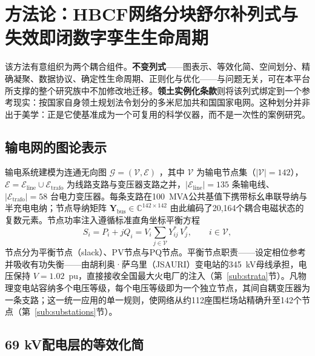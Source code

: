 \section{方法论：HBCF网络分块舒尔补列式与失效即闭数字孪生生命周期}
\label{sec:methodology}

该方法有意组织为两个耦合组件。\textbf{不变列式}——图表示、等效化简、空间划分、精确凝聚、数据协议、确定性生命周期、正则化与优化——与问题无关，可在本平台所支撑的整个研究族中不加修改地迁移。\textbf{领土实例化条款}则将该列式绑定到一个参考现实：按国家自身领土规划法令划分的多米尼加共和国国家电网。这种划分并非出于美学：正是它使基准成为一个可复用的科学仪器，而不是一次性的案例研究。

\subsection{输电网的图论表示}
\label{sub:graph}

输电系统建模为连通无向图 $\mathcal{G} = (\mathcal{V}, \mathcal{E})$ \cite{newman2010}，其中 $\mathcal{V}$ 为输电节点集（$|\mathcal{V}| = 142$），$\mathcal{E} = \mathcal{E}_{\mathrm{line}} \cup \mathcal{E}_{\mathrm{trafo}}$ 为线路支路与变压器支路之并，$|\mathcal{E}_{\mathrm{line}}| = 135$ 条输电线、$|\mathcal{E}_{\mathrm{trafo}}| = 58$ 台电力变压器。每条支路在100~MVA公共基值下携带标幺串联导纳与半充电电纳；节点导纳矩阵 $\mathbf{Y}_{\mathrm{bus}} \in \mathbb{C}^{142 \times 142}$ 由此编码了20,164个耦合电磁状态的复数元素。节点功率注入遵循标准直角坐标平衡方程
\begin{equation}
S_i = P_i + jQ_i = V_i \sum_{j \in \mathcal{V}} Y_{ij}^{*}\, V_j^{*}, \qquad i \in \mathcal{V},
\label{eq:balance}
\end{equation}
节点分为平衡节点（slack）、PV节点与PQ节点\cite{tinney1967}。平衡节点职责——设定相位参考并吸收有功失衡——由胡利奥·萨乌里（JSAURI）变电站的345~kV母线承担，电压保持 $V = 1.02$~pu，直接接收全国最大火电厂的注入（第~\ref{sub:strata}节）。凡物理变电站容纳多个电压等级，每个电压等级即为一个独立节点，其间自耦变压器为一条支路；这一统一应用的单一规则，使网络从约112座围栏场站精确升至142个节点（第~\ref{sub:substations}节）。

\subsection{69 kV配电层的等效化简}
\label{sub:reduction}

